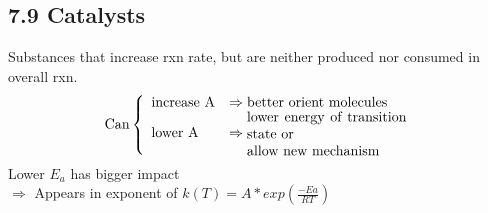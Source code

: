 \subsection{7.9 Catalysts}
    Substances that increase rxn rate, but are neither produced nor consumed in overall rxn.
    $$
    \text{Can} \left\{
        \begin{array}{ll}
            \text{increase A} &\Rightarrow \text{better orient molecules}\\
            \text{lower A} &\Rightarrow \parbox{4cm}{lower energy of transition state or\\allow new mechanism}
        \end{array}
    \right.
    $$
    Lower $E_a$ has bigger impact\\ 
    $\Rightarrow$ Appears in exponent of $k(T) = A*exp(\frac{-E a}{R T})$